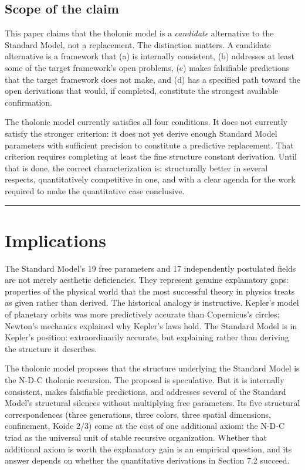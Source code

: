 \documentclass[12pt]{article}
\begin{document}
\subsection{Scope of the claim}\label{scope-of-the-claim}

This paper claims that the tholonic model is a \emph{candidate}
alternative to the Standard Model, not a replacement. The distinction
matters. A candidate alternative is a framework that (a) is internally
consistent, (b) addresses at least some of the target framework's open
problems, (c) makes falsifiable predictions that the target framework
does not make, and (d) has a specified path toward the open derivations
that would, if completed, constitute the strongest available
confirmation.

The tholonic model currently satisfies all four conditions. It does not
currently satisfy the stronger criterion: it does not yet derive enough
Standard Model parameters with sufficient precision to constitute a
predictive replacement. That criterion requires completing at least the
fine structure constant derivation. Until that is done, the correct
characterization is: structurally better in several respects,
quantitatively competitive in one, and with a clear agenda for the work
required to make the quantitative case conclusive.

\begin{center}\rule{0.5\linewidth}{0.5pt}\end{center}

\section{Implications}\label{implications}

The Standard Model's 19 free parameters and 17 independently postulated
fields are not merely aesthetic deficiencies. They represent genuine
explanatory gaps: properties of the physical world that the most
successful theory in physics treats as given rather than derived. The
historical analogy is instructive. Kepler's model of planetary orbits
was more predictively accurate than Copernicus's circles; Newton's
mechanics explained why Kepler's laws hold. The Standard Model is in
Kepler's position: extraordinarily accurate, but explaining rather than
deriving the structure it describes.

The tholonic model proposes that the structure underlying the Standard
Model is the N-D-C tholonic recursion. The proposal is speculative. But
it is internally consistent, makes falsifiable predictions, and
addresses several of the Standard Model's structural silences without
multiplying free parameters. Its five structural correspondences (three
generations, three colors, three spatial dimensions, confinement, Koide
\(2/3\)) come at the cost of one additional axiom: the N-D-C triad as
the universal unit of stable recursive organization. Whether that
additional axiom is worth the explanatory gain is an empirical question,
and its answer depends on whether the quantitative derivations in
Section 7.2 succeed.
\end{document}

